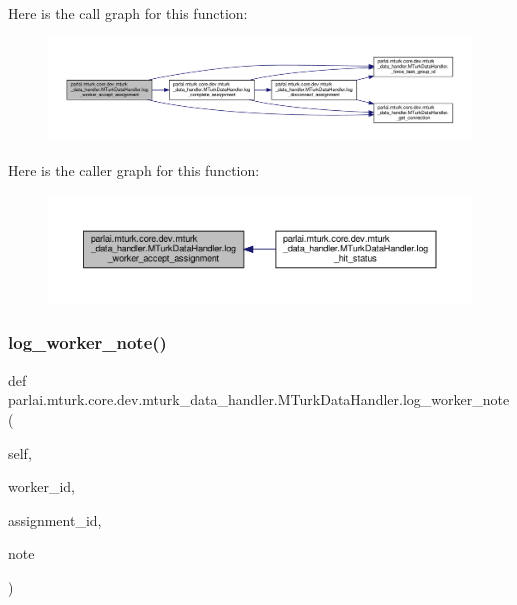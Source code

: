 Here is the call graph for this function\+:
\nopagebreak
\begin{figure}[H]
\begin{center}
\leavevmode
\includegraphics[width=350pt]{classparlai_1_1mturk_1_1core_1_1dev_1_1mturk__data__handler_1_1MTurkDataHandler_a7b7b243f1ae901dce38b639fb9dcde22_cgraph}
\end{center}
\end{figure}
Here is the caller graph for this function\+:
\nopagebreak
\begin{figure}[H]
\begin{center}
\leavevmode
\includegraphics[width=350pt]{classparlai_1_1mturk_1_1core_1_1dev_1_1mturk__data__handler_1_1MTurkDataHandler_a7b7b243f1ae901dce38b639fb9dcde22_icgraph}
\end{center}
\end{figure}
\mbox{\label{classparlai_1_1mturk_1_1core_1_1dev_1_1mturk__data__handler_1_1MTurkDataHandler_acb69b500f70e42e4e8a99e224534cc27}} 
\subsubsection{\texorpdfstring{log\+\_\+worker\+\_\+note()}{log\_worker\_note()}}
{\footnotesize\ttfamily def parlai.\+mturk.\+core.\+dev.\+mturk\+\_\+data\+\_\+handler.\+M\+Turk\+Data\+Handler.\+log\+\_\+worker\+\_\+note (\begin{DoxyParamCaption}\item[{}]{self,  }\item[{}]{worker\+\_\+id,  }\item[{}]{assignment\+\_\+id,  }\item[{}]{note }\end{DoxyParamCaption})}

